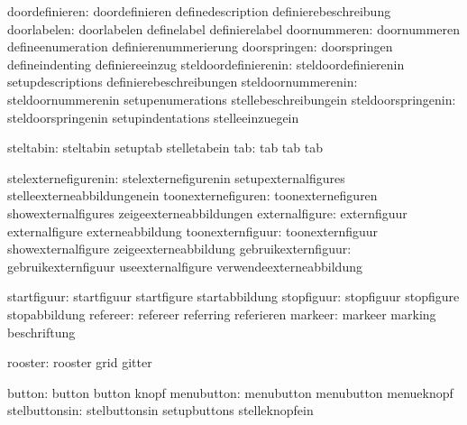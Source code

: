                doordefinieren:  doordefinieren               definedescription
                                definierebeschreibung
                  doorlabelen:  doorlabelen                  definelabel
                                definierelabel
                 doornummeren:  doornummeren                 defineenumeration
                                definierenummerierung
                 doorspringen:  doorspringen                 defineindenting
                                definiereeinzug
         steldoordefinierenin:  steldoordefinierenin         setupdescriptions
                                definierebeschreibungen
           steldoornummerenin:  steldoornummerenin           setupenumerations
                                stellebeschreibungein
           steldoorspringenin:  steldoorspringenin           setupindentations
                                stelleeinzuegein

                    steltabin:  steltabin                    setuptab
                                stelletabein
                          tab:  tab                          tab
                                tab

         stelexternefigurenin:  stelexternefigurenin         setupexternalfigures
                                stelleexterneabbildungenein
           toonexternefiguren:  toonexternefiguren           showexternalfigures
                                zeigeexterneabbildungen
               externalfigure:  externfiguur                 externalfigure
                                externeabbildung
             toonexternfiguur:  toonexternfiguur             showexternalfigure
                                zeigeexterneabbildung
          gebruikexternfiguur:  gebruikexternfiguur          useexternalfigure
                                verwendeexterneabbildung

                  startfiguur:  startfiguur                  startfigure
                                startabbildung
                   stopfiguur:  stopfiguur                   stopfigure
                                stopabbildung
                     refereer:  refereer                     referring
                                referieren
                      markeer:  markeer                      marking
                                beschriftung

                      rooster:  rooster                      grid
                                gitter

                       button:  button                       button
                                knopf
                   menubutton:  menubutton                   menubutton
                                menueknopf
                stelbuttonsin:  stelbuttonsin                setupbuttons
                                stelleknopfein

